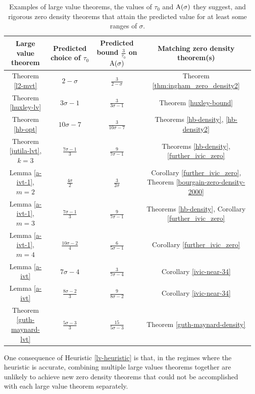 \begin{table}[ht]
    \def\arraystretch{1.3}
    \centering
    \caption{Examples of large value theorems, the values of $\tau_0$ and $\mathrm{A}(\sigma)$ they suggest, and rigorous zero density theorems that attain the predicted value for at least some ranges of $\sigma$.}
    \begin{tabular}{|c|c|c|c|}
    \hline
    Large value theorem & Predicted choice of $\tau_0$ & Predicted bound $\frac{3}{\tau_0}$ on $\mathrm{A}(\sigma)$ & Matching zero density theorem(s)\\
    \hline
    Theorem \ref{l2-mvt} & $2-\sigma$ & $\frac{3}{2-\sigma}$ & Theorem \ref{thm:ingham_zero_density2}\\
    \hline
    Theorem \ref{huxley-lv} & $3\sigma-1$ & $\frac{3}{3\sigma-1}$ & Theorem \ref{huxley-bound} \\
    \hline
    Theorem \ref{hb-opt} & $10\sigma-7$ & $\frac{3}{10\sigma-7}$ & Theorems \ref{hb-density}, \ref{hb-density2} \\
    \hline
    Theorem \ref{jutila-lvt}, $k=3$ & $\frac{7\sigma-1}{3}$ & $\frac{9}{7\sigma-1}$ & Theorems \ref{hb-density}, \ref{further_ivic_zero} \\
    \hline
    Lemma \ref{a-ivt-1}, $m=2$ & $\frac{4\sigma}{2}$ & $\frac{3}{2\sigma}$ & Corollary \ref{further_ivic_zero}, Theorem \ref{bourgain-zero-density-2000} \\
    \hline
    Lemma \ref{a-ivt-1}, $m=3$ & $\frac{7\sigma-1}{3}$ & $\frac{9}{7\sigma-1}$ & Theorems \ref{hb-density}, Corollary \ref{further_ivic_zero} \\
    \hline
    Lemma \ref{a-ivt-1}, $m=4$ & $\frac{10\sigma-2}{4}$ & $\frac{6}{5\sigma-1}$ & Corollary \ref{further_ivic_zero} \\
    \hline
    Lemma \ref{a-ivt} & $7\sigma-4$ & $\frac{3}{7\sigma-4}$ & Corollary \ref{ivic-near-34} \\
    \hline
    Lemma \ref{a-ivt} & $\frac{8\sigma-2}{3}$ & $\frac{9}{8\sigma-2}$ & Corollary \ref{ivic-near-34} \\
    \hline
    Theorem \ref{guth-maynard-lvt} & $\frac{5\sigma-3}{3}$ & $\frac{15}{5\sigma-3}$ & Theorem \ref{guth-maynard-density} \\
    \hline
    \end{tabular}
    \label{zero_density_heuristic}
    \end{table}

    One consequence of Heuristic \ref{lv-heuristic} is that, in the regimes where the heuristic is accurate, combining multiple large values theorems together are unlikely to achieve new zero density theorems that could not be accomplished with each large value theorem separately.
